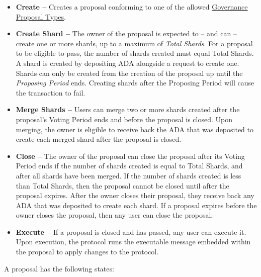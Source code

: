 \documentclass{article}
\begin{document}
\begin{sloppypar}
\begin{itemize}
\item
  \textbf{Create --} Creates a proposal conforming to one of the allowed
  \protect\hyperlink{governance-proposal-types}{Governance Proposal
  Types}.
\item
  \textbf{Create Shard --} The owner of the proposal is expected to --
  and can -- create one or more shards, up to a maximum of \emph{Total
  Shards}. For a proposal to be eligible to pass, the number of shards
  created must equal Total Shards. A shard is created by depositing ADA
  alongside a request to create one. Shards can only be created from the
  creation of the proposal up until the \emph{Proposing Period} ends.
  Creating shards after the Proposing Period will cause the transaction
  to fail.
\item
  \textbf{Merge Shards --} Users can merge two or more shards created
  after the proposal's Voting Period ends and before the proposal is
  closed. Upon merging, the owner is eligible to receive back the ADA
  that was deposited to create each merged shard after the proposal is
  closed.
\item
  \textbf{Close --} The owner of the proposal can close the proposal
  after its Voting Period ends if the number of shards created is equal
  to Total Shards, and after all shards have been merged. If the number
  of shards created is less than Total Shards, then the proposal cannot
  be closed until after the proposal expires. After the owner closes
  their proposal, they receive back any ADA that was deposited to create
  each shard. If a proposal expires before the owner closes the
  proposal, then any user can close the proposal.
\item
  \textbf{Execute --} If a proposal is closed and has passed, any user
  can execute it. Upon execution, the protocol runs the executable
  message embedded within the proposal to apply changes to the protocol.
\end{itemize}

A proposal has the following states:


\end{sloppypar}
\end{document}
